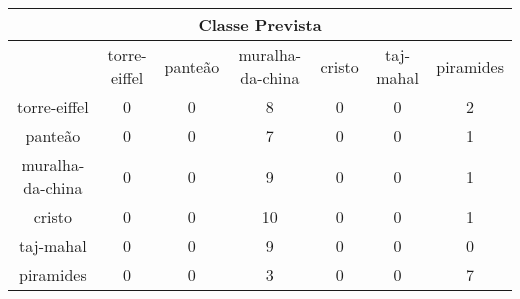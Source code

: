 \begin{tabular}{|c|c|c|c|c|c|c|}
\hline
\multicolumn{7}{|c|}{Classe Prevista}\\
\hline
 & torre-eiffel & panteão & muralha-da-china & cristo & taj-mahal & piramides\\
torre-eiffel & 0 & 0 & 8 & 0 & 0 & 2\\
panteão & 0 & 0 & 7 & 0 & 0 & 1\\
muralha-da-china & 0 & 0 & 9 & 0 & 0 & 1\\
cristo & 0 & 0 & 10 & 0 & 0 & 1\\
taj-mahal & 0 & 0 & 9 & 0 & 0 & 0\\
piramides & 0 & 0 & 3 & 0 & 0 & 7\\
\hline
\end{tabular}
